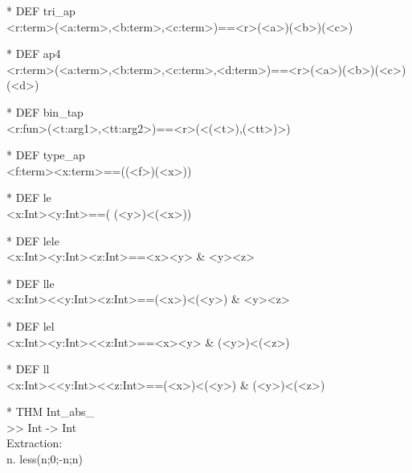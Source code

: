 \begin{prl*}
\>* DEF tri\_ap\\
\>  <r:term>(<a:term>,<b:term>,<c:term>)==<r>(<a>)(<b>)(<c>)
\end{prl*}

\begin{prl*}
\>* DEF ap4\\
\>  <r:term>(<a:term>,<b:term>,<c:term>,<d:term>)==<r>(<a>)(<b>)(<c>)(<d>)
\end{prl*}

\begin{prl*}
\>* DEF bin\_tap\\
\>  <r:fun>(<t:arg1>,<tt:arg2>)==<r>(<(<t>),(<tt>)>)
\end{prl*}

\begin{prl*}
\>* DEF type\_ap\\
\>  <f:term><x:term>==((<f>)(<x>))
\end{prl*}

\begin{prl*}
\>* DEF le\\
\>  <x:Int>\mleq{}<y:Int>==\mneg{}( (<y>)<(<x>))
\end{prl*}

\begin{prl*}
\>* DEF lele\\
\>  <x:Int>\mleq{}<y:Int>\mleq{}<z:Int>==<x>\mleq{}<y> \& <y>\mleq{}<z>
\end{prl*}

\begin{prl*}
\>* DEF lle\\
\>  <x:Int>\mbackslash{}<<y:Int>\mleq{}<z:Int>==(<x>)<(<y>) \& <y>\mleq{}<z>
\end{prl*}

\begin{prl*}
\>* DEF lel\\
\>  <x:Int>\mleq{}<y:Int>\mbackslash{}<<z:Int>==<x>\mleq{}<y> \& (<y>)<(<z>)
\end{prl*}

\begin{prl*}
\>* DEF ll\\
\>  <x:Int>\mbackslash{}<<y:Int>\mbackslash{}<<z:Int>==(<x>)<(<y>) \& (<y>)<(<z>)
\end{prl*}

\begin{prl*}
\>* THM Int\_abs\_\\
\>  >> Int -> Int\\
\>  Extraction:\\
\>  \mlambda{} n.  less(n;0;-n;n)
\end{prl*}

